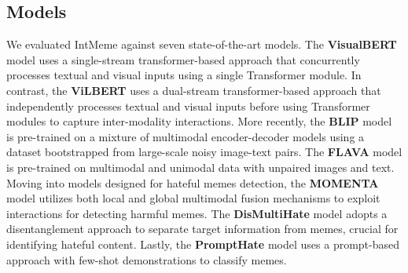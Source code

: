 \subsection{Models}
We evaluated \textsf{IntMeme} against seven state-of-the-art models. The \textbf{VisualBERT} \cite{li2019visualbert} model uses a single-stream transformer-based approach that concurrently processes textual and visual inputs using a single Transformer module. In contrast, the \textbf{ViLBERT} \cite{lu2019vilbert} uses a dual-stream transformer-based approach that independently processes textual and visual inputs before using Transformer modules to capture inter-modality interactions. More recently, the \textbf{BLIP} \cite{li2022blip} model is pre-trained on a mixture of multimodal encoder-decoder models using a dataset bootstrapped from large-scale noisy image-text pairs. The \textbf{FLAVA} \cite{singh2022flava} model is pre-trained on multimodal and unimodal data with unpaired images and text. Moving into models designed for hateful memes detection, the \textbf{MOMENTA} \cite{pramanick2021momenta} model utilizes both local and global multimodal fusion mechanisms to exploit interactions for detecting harmful memes. The \textbf{DisMultiHate} \cite{lee2021disentangling} model adopts a disentanglement approach to separate target information from memes, crucial for identifying hateful content. Lastly, the \textbf{PromptHate} \cite{cao2022prompting} model uses a prompt-based approach with few-shot demonstrations to classify memes.



